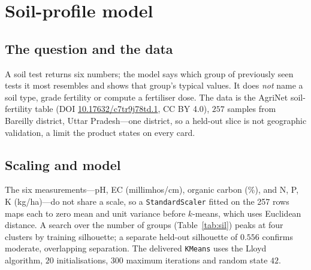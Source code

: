\documentclass[11pt,a4paper]{article}
\begin{document}
\section{Soil-profile model}\label{sec:soil}

\subsection{The question and the data}
A soil test returns six numbers; the model says which group of previously seen tests it most
resembles and shows that group's typical values. It does \emph{not} name a soil type, grade
fertility or compute a fertiliser dose. The data is the AgriNet soil-fertility table
(DOI \href{https://doi.org/10.17632/c7tr9j78td.1}{10.17632/c7tr9j78td.1}, CC BY 4.0), $257$ samples
from Bareilly district, Uttar Pradesh---one district, so a held-out slice is not geographic
validation, a limit the product states on every card.

\subsection{Scaling and model}
The six measurements---pH, EC (millimhos/cm), organic carbon (\%), and N, P, K (kg/ha)---do not
share a scale, so a \texttt{StandardScaler} fitted on the 257 rows maps each to zero mean and unit
variance before $k$-means, which uses Euclidean distance. A search over the number of groups
(Table~\ref{tab:sil}) peaks at four clusters by training silhouette; a separate held-out silhouette
of $0.556$ confirms moderate, overlapping separation. The delivered \texttt{KMeans} uses the Lloyd
algorithm, $20$ initialisations, $300$ maximum iterations and random state $42$.
\end{document}
